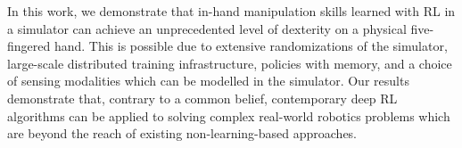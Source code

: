 In this work, we demonstrate that
in-hand manipulation skills learned with RL in a simulator can achieve an unprecedented
level of dexterity on  a physical five-fingered hand.
This is possible due to extensive randomizations of the simulator,
large-scale distributed training infrastructure, policies with memory, and
a choice of sensing modalities which can be modelled in the simulator.
Our results demonstrate that,
contrary to a common belief,
contemporary deep RL algorithms
can be applied to solving complex real-world robotics problems which
are beyond the reach of existing non-learning-based approaches.






